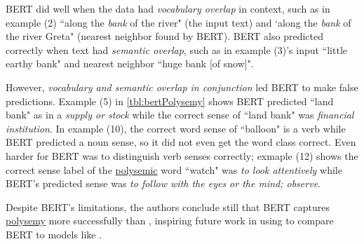 BERT did well when the data had \emph{vocabulary overlap} in context, such as in example (2) ``along the \emph{bank} of the river" (the input text) and `along the \emph{bank} of the river Greta" (nearest neighbor found by BERT). BERT also predicted correctly when text had \emph{semantic overlap}, such as in example (3)'s input ``little earthy bank" and nearest neighbor ``huge bank [of snow]". 

However, \emph{vocabulary and semantic overlap in conjunction} led BERT to make false predictions. Example (5) in \cref{tbl:bertPolysemy} shows BERT predicted ``land bank" as in a \emph{supply or stock} while the correct sense of ``land bank" was \emph{financial institution}. In example (10), the correct word sense of ``balloon" is a verb while BERT predicted a noun sense, so it did not even get the word class correct. Even harder for BERT was to distinguish verb senses correctly; exmaple (12) shows the correct sense label of the \hyperref[sec:Polysemy]{polysemic} word ``watch" was \emph{to look attentively} while BERT's predicted sense was \emph{to follow with the eyes or the mind; observe}. 

Despite BERT's limitations, the authors conclude still that BERT captures \hyperref[sec:Polysemy]{polysemy} more successfully than , inspiring future work in using  to compare BERT to models like . 